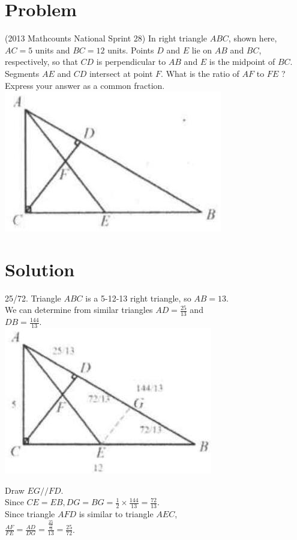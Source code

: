 \documentclass{article}
\begin{document}
\section*{Problem}
(2013 Mathcounts National Sprint 28) In right triangle \(A B C\), shown here, \(A C=5\) units and \(B C=12\) units. Points \(D\) and \(E\) lie on \(A B\) and \(B C\), respectively, so that \(C D\) is perpendicular to \(A B\) and \(E\) is the midpoint of \(B C\). Segments \(A E\) and \(C D\) intersect at point \(F\). What is the ratio of \(A F\) to \(F E\) ? Express your answer as a common fraction.\\
\centering
\includegraphics[width=\textwidth]{images/127(1).jpg}

\section*{Solution}
25/72.
Triangle \(A B C\) is a 5-12-13 right triangle, so \(A B=13\).\\
We can determine from similar triangles \(A D=\frac{25}{13}\) and\\
\(D B=\frac{144}{13}\).\\
\centering
\includegraphics[width=\textwidth]{images/134.jpg}

Draw \(E G / / F D\).\\
Since \(C E=E B, D G=B G=\frac{1}{2} \times \frac{144}{13}=\frac{72}{13}\).\\
Since triangle \(A F D\) is similar to triangle \(A E C\),\\
\(\frac{A F}{F E}=\frac{A D}{D G}=\frac{\frac{25}{\frac{13}{72}}}{13}=\frac{25}{72}\).
\end{document}
